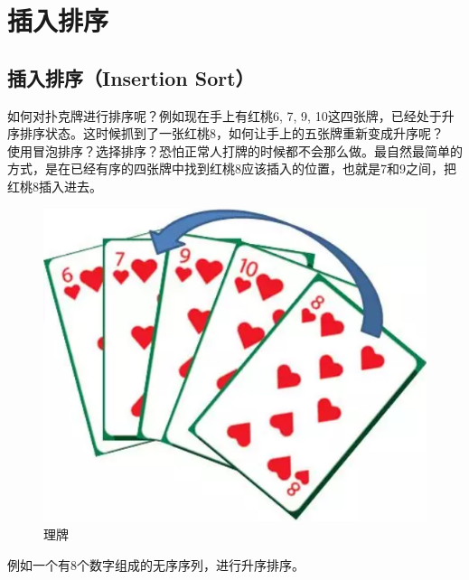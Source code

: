 \newpage

\section{插入排序}

\subsection{插入排序（Insertion Sort）}

如何对扑克牌进行排序呢？例如现在手上有红桃6, 7, 9, 10这四张牌，已经处于升序排序状态。这时候抓到了一张红桃8，如何让手上的五张牌重新变成升序呢？ \\

使用冒泡排序？选择排序？恐怕正常人打牌的时候都不会那么做。最自然最简单的方式，是在已经有序的四张牌中找到红桃8应该插入的位置，也就是7和9之间，把红桃8插入进去。

\begin{figure}[H]
    \centering
    \includegraphics[scale=0.4]{img/C8/8-4/1.png}
    \caption{理牌}
\end{figure}

例如一个有8个数字组成的无序序列，进行升序排序。

